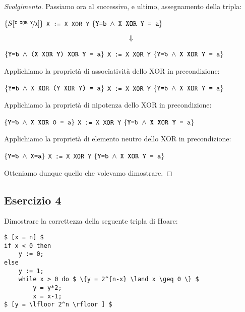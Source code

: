 \begin{proof}[Svolgimento]
Passiamo ora al successivo, e ultimo, assegnamento della tripla:
\begin{center}
$ \{ S[\nicefrac{\text{\texttt{X XOR Y}}}{\text{\texttt{X}}} ] \} $
\texttt{X := X XOR Y}
$ \{ \text{\texttt{Y=b}} \; \land \; \text{\texttt{X XOR Y = a}} \} $
\end{center}
$$ \Downarrow $$
\begin{center}
$ \{ \text{\texttt{Y=b}} \; \land \; \text{\texttt{(X XOR Y) XOR Y = a}} \} $
\texttt{X := X XOR Y}
$ \{ \text{\texttt{Y=b}} \; \land \; \text{\texttt{X XOR Y = a}} \} $
\end{center}
Applichiamo la proprietà di associatività dello XOR in precondizione:
\begin{center}
$ \{ \text{\texttt{Y=b}} \; \land \; \text{\texttt{X XOR (Y XOR Y) = a}} \} $
\texttt{X := X XOR Y}
$ \{ \text{\texttt{Y=b}} \; \land \; \text{\texttt{X XOR Y = a}} \} $
\end{center}
Applichiamo la proprietà di nipotenza dello XOR in precondizione:
\begin{center}
$ \{ \text{\texttt{Y=b}} \; \land \; \text{\texttt{X XOR 0 = a}} \} $
\texttt{X := X XOR Y}
$ \{ \text{\texttt{Y=b}} \; \land \; \text{\texttt{X XOR Y = a}} \} $
\end{center}
Applichiamo la proprietà di elemento neutro dello XOR in precondizione:
\begin{center}
$ \{ \text{\texttt{Y=b}} \; \land \; \text{\texttt{X=a}} \} $
\texttt{X := X XOR Y}
$ \{ \text{\texttt{Y=b}} \; \land \; \text{\texttt{X XOR Y = a}} \} $
\end{center}
Otteniamo dunque quello che volevamo dimostrare.
\end{proof}


\subsection{Esercizio 4}

Dimostrare la correttezza della seguente tripla di Hoare:
\begin{lstlisting}[mathescape, numberfirstline=false, frame=single]
$ [x = n] $
if x < 0 then
	y := 0;
else
	y := 1;
	while x > 0 do $ \{y = 2^{n-x} \land x \geq 0 \} $
		y = y*2;
		x = x-1;
$ [y = \lfloor 2^n \rfloor ] $
\end{lstlisting}

